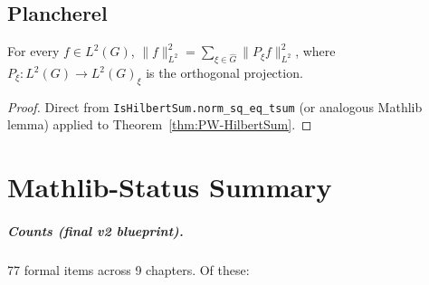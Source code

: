 \section{Plancherel}

\begin{theorem}
  \label{thm:plancherel-isotypic}
  For every $f \in L^2(G)$,
  $\|f\|_{L^2}^2 = \sum_{\xi \in \widehat G}\|P_\xi f\|_{L^2}^2$,
  where $P_\xi : L^2(G) \to L^2(G)_\xi$ is the orthogonal projection.
\end{theorem}

\begin{proof}
  Direct from \texttt{IsHilbertSum.norm\_sq\_eq\_tsum} (or analogous
  Mathlib lemma) applied to Theorem~\ref{thm:PW-HilbertSum}.
\end{proof}


\chapter{Mathlib-Status Summary}
\label{chap:status}

\paragraph{Counts (final v2 blueprint).}
77 formal items across 9 chapters. Of these:

